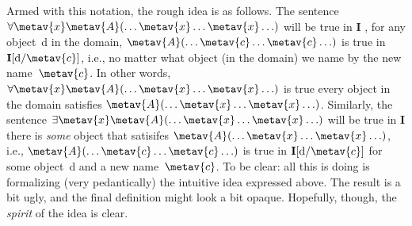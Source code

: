 Armed with this notation, the rough idea is as follows. The sentence
$\forall \metav{x}\metav{A}(\ldots \metav{x} \ldots \metav{x} \ldots)$
will be true in $\mathbf{I}$ \ifeff, for any object~d in the domain,
$\metav{A}(\ldots \metav{c} \ldots \metav{c}\ldots)$ is true in
$\mathbf{I}[\text{d}/\metav{c}]$, i.e., no matter what object (in
the domain) we name by the new name~$\metav{c}$. In other words,
$\forall \metav{x} \metav{A}(\ldots \metav{x} \ldots \metav{x}
\ldots)$ is true \ifeff{} every object in the domain satisfies
$\metav{A}(\ldots \metav{x} \ldots \metav{x} \ldots)$. Similarly, the
sentence $\exists \metav{x}\metav{A}(\ldots \metav{x} \ldots \metav{x}
\ldots)$ will be true in $\mathbf{I}$ \ifeff{} there is \emph{some}
object that satisifes $\metav{A}(\ldots \metav{x} \ldots \metav{x}
\ldots)$, i.e., $\metav{A}(\ldots \metav{c} \ldots \metav{c} \ldots)$
is true in $\mathbf{I}[\text{d}/\metav{c}]$ for some object~d and a
new name~$\metav{c}$. 
To be clear: all this is doing is formalizing (very pedantically) the intuitive idea expressed above. The result is a bit ugly, and the final definition might look a bit opaque. Hopefully, though, the \emph{spirit} of the idea is clear.

